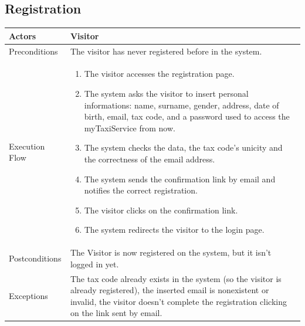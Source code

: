 \clearpage

\subsection{Registration}
\begin{tabular}{lp{8cm}}
	\hline 
	Actors & Visitor  \\ \hline
	Preconditions & The visitor has never registered before in the system.  \\ \hline
	Execution Flow &  \begin{enumerate}
					\item The visitor accesses the registration page.
					\item The system asks the visitor to insert personal informations: name, surname, gender, address, date of birth, email, tax code, and a password used to access the myTaxiService from now.
					\item The system checks the data, the tax code's unicity and the correctness of the email address.
					\item The system sends the confirmation link by email and notifies the correct registration.
					\item The visitor clicks on the confirmation link.
					\item The system redirects the visitor to the login page.
				\end{enumerate}
	 \\ \hline
	 Postconditions & The Visitor is now registered on the system, but it isn't logged in yet. \\ \hline
	 Exceptions &  The tax code already exists in the system (so the visitor is already registered), the inserted email is nonexistent or invalid, the visitor doesn't complete the registration clicking on the link sent by email.  \\ \hline
\end{tabular}

\clearpage

